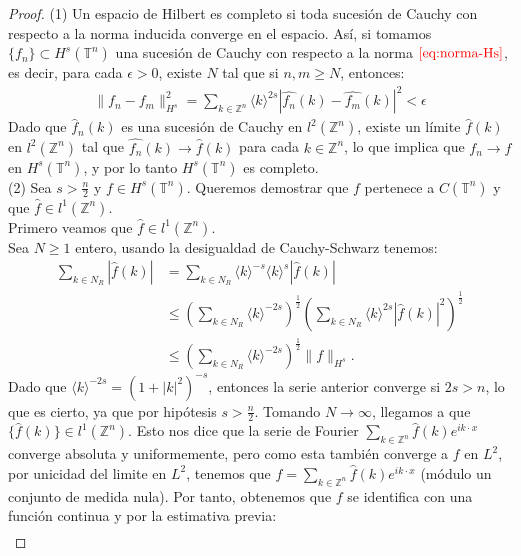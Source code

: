     \begin{proof}
      (1) Un espacio de Hilbert es completo si toda sucesión de Cauchy con respecto a la norma inducida converge en el espacio. Así, si tomamos $\{f_n\}\subset H^s(\mathbb{T}^{n})$ una sucesión de Cauchy con respecto a la norma $\textcolor{red}{\ref{eq:norma-Hs}}$, es decir, para cada $\epsilon > 0$, existe $N$ tal que si $n, m \geq N$, entonces:
      \begin{align*}
        \|f_n-f_m\|_{H^s}^2=\sum_{k\in\mathbb{Z}^{n}}\langle k \rangle^{2s}|\hat{f_n}(k)-\hat{f_m}(k)|^2<\epsilon
      \end{align*}
      Dado que ${\hat{f}_n(k)}$ es una sucesión de Cauchy en $l^2(\mathbb{Z}^n)$, existe un límite $\hat{f}(k)$ en $l^2(\mathbb{Z}^n)$ tal que $\hat{f_n}(k)\to\hat{f}(k)$ para cada $k\in\mathbb{Z}^{n}$, lo que implica que $f_n \to f$ en $H^s(\mathbb{T}^n)$, y por lo tanto $H^s(\mathbb{T}^n)$ es completo.\\
      (2) Sea $s > \frac{n}{2}$ y $f \in H^s(\mathbb{T}^n)$. Queremos demostrar que $f$ pertenece a $C(\mathbb{T}^n)$ y que $\hat{f} \in l^1(\mathbb{Z}^n)$.\\
      Primero veamos que $\hat{f}\in l^1(\mathbb{Z}^{n})$.\\
      Sea $N\geq 1$ entero, usando la desigualdad de Cauchy-Schwarz tenemos:
      \begin{align*}
        \sum_{k\in N_R}|\hat{f}(k)|&=\sum_{k\in N_R}\langle k \rangle^{-s}\langle k \rangle^s|\hat{f}(k)|\\
        &\leq \left( \sum_{k\in N_R}\langle k \rangle^{-2s} \right)^{\frac{1}{2}}\left( \sum_{k\in N_R}\langle k \rangle^{2s}|\hat{f}(k)|^2 \right)^{\frac{1}{2}}\\
        &\leq \left( \sum_{k\in N_R}\langle k \rangle^{-2s} \right)^{\frac{1}{2}}\|f\|_{H^s}.
      \end{align*}
      Dado que $\langle k \rangle^{-2s}=(1+|k|^2)^{-s}$, entonces la serie anterior converge si $2s>n$, lo que es cierto, ya que por hipótesis $s>\frac{n}{2}$. Tomando $N\to\infty$, llegamos a que $\{\hat{f}(k)\} \in l^1(\mathbb{Z}^{n})$. Esto nos dice que la serie de Fourier $\sum_{k\in\mathbb{Z}^{n}}\hat{f}(k)e^{ik\cdot x}$ converge absoluta y uniformemente, pero como esta también converge a $f$ en $L^2$, por unicidad del limite en $L^2$, tenemos que $f=\sum_{k\in\mathbb{Z}^{n}}\hat{f}(k)e^{ik\cdot x}$ (módulo un conjunto de medida nula). Por tanto, obtenemos que $f$ se identifica con una función continua y por la estimativa previa:
      \begin{align*}

\end{align*}
\end{proof}
